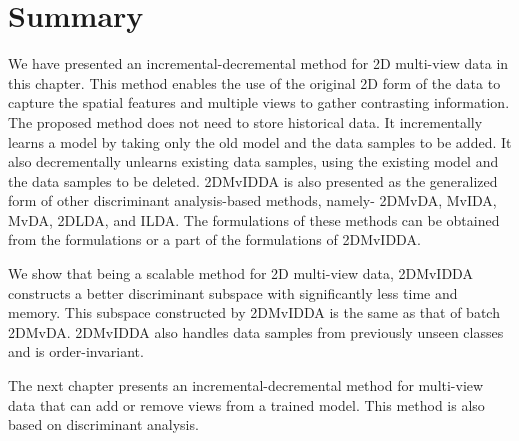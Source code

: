 \section{Summary}
\label{sec:2DMvIDDA_conc}
We have presented an incremental-decremental method for 2D multi-view data in this chapter. This method enables the use of the original 2D form of the data to capture the spatial features and multiple views to gather contrasting information. The proposed method does not need to store historical data. It incrementally learns a model by taking only the old model and the data samples to be added. It also decrementally unlearns existing data samples, using the existing model and the data samples to be deleted. 2DMvIDDA is also presented as the generalized form of other discriminant analysis-based methods, namely- 2DMvDA, MvIDA, MvDA, 2DLDA, and ILDA. The formulations of these methods can be obtained from the formulations or a part of the formulations of 2DMvIDDA.

We show that being a scalable method for 2D multi-view data, 2DMvIDDA constructs a better discriminant subspace with significantly less time and memory. This subspace constructed by 2DMvIDDA is the same as that of batch 2DMvDA. 2DMvIDDA also handles data samples from previously unseen classes and is order-invariant.%

The next chapter presents an incremental-decremental method for multi-view data that can add or remove views from a trained model. This method is also based on discriminant analysis.

\chapterend
\cleardoublepage